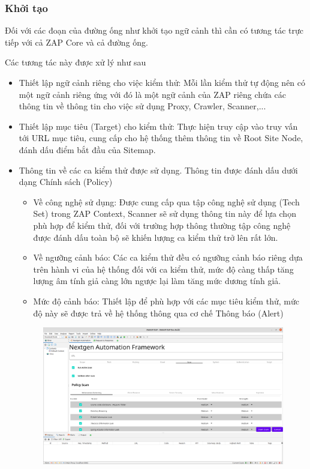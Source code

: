 \documentclass[./../main.tex]{subfiles}
\begin{document}
\subsubsection{Khởi tạo}

Đối với các đoạn của đường ống như khởi tạo ngữ cảnh thì cần có tương tác trực tiếp với cả ZAP Core và cả đường ống.

Các tương tác này được xử lý như sau
\begin{itemize}
	\item Thiết lập ngữ cảnh riêng cho việc kiểm thử: Mỗi lần kiểm thử tự động nên có một ngữ cảnh riêng ứng với đó là một ngữ cảnh của ZAP riêng chứa các thông tin về thông tin cho việc sử dụng Proxy, Crawler, Scanner,...
	\item Thiết lập mục tiêu (Target) cho kiểm thử: Thực hiện truy cập vào truy vấn tới URL mục tiêu, cung cấp cho hệ thống thêm thông tin về Root Site Node, đánh dấu điểm bắt đầu của Sitemap.
	\item Thông tin về các ca kiểm thử được sử dụng. Thông tin được đánh dấu dưới dạng Chính sách (Policy)
	      \begin{itemize}
		      \item Về công nghệ sử dụng: Được cung cấp qua tập công nghệ sử dụng (Tech Set) trong ZAP Context, Scanner sẽ sử dụng thông tin này để lựa chọn phù hợp để kiểm thử, đối với trường hợp thông thường tập công nghệ được đánh dấu toàn bộ sẽ khiến lượng ca kiểm thử trở lên rất lớn.
		      \item Về ngưỡng cảnh báo: Các ca kiểm thử đều có ngưỡng cảnh báo riêng dựa trên hành vi của hệ thống đối với ca kiểm thử, mức độ càng thấp tăng lượng âm tính giả càng lớn ngược lại làm tăng mức dương tính giả.
		      \item Mức độ cảnh báo: Thiết lập để phù hợp với các mục tiêu kiểm thử, mức độ này sẽ được trả về hệ thống thông qua cơ chế Thông báo (Alert)
	      \end{itemize}
	      \begin{figure}[H]
		      \includegraphics[width=\linewidth]{./images/policy.png}

\end{figure}
\end{itemize}
\end{document}
